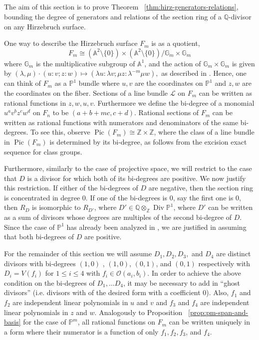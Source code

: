 \documentclass{amsart}
\theoremstyle{plain}
\theoremstyle{definition}
\theoremstyle{remark}
\numberwithin{equation}{subsection}
\newcommand\bq{{\mathbb Q}}
\newcommand\bp{{\mathbb P}}
\newcommand\bz{{\mathbb Z}}
\newcommand\ba{{\mathbb A}}
\newcommand\sco{{\mathscr O}}
\DeclareMathOperator\di{Div}
\newcommand\bida{a}
\newcommand\bidb{b}
\newcommand\hirz{F}
\DeclareMathOperator{\Pic}{Pic}
\begin{document}
\subsection{}
The aim of this section is to prove Theorem
~\ref{thm:hirz-generators-relations}, bounding the degree of
generators and relations of the section ring of a $\bq$-divisor
on any Hirzebruch surface.

One way to describe the Hirzebruch surface $\hirz_m$ is as a
quotient,
\[
\hirz_m \cong (\ba^2 \setminus \{0\}) \times (\ba^2 \setminus \{0\})/\mathbb G_m \times \mathbb G_m
\]
where $\mathbb G_m$ is the multiplicative subgroup of $\ba^1$, and the action of $\mathbb G_m \times \mathbb G_m$ is given by
$(\lambda, \mu) \cdot (u\colon v; z\colon w) \mapsto (\lambda u\colon \lambda v; \mu z\colon \lambda^{-m} \mu w),$ as described in \cite[p.~ 6]{zhao:counting-cubic}. Hence, one can think of
$\hirz_m$ as a $\bp^1$ bundle where $u,v$ are the coordinates on
$\bp^1$ and $z,w$ are the coordinates on the fiber.
Sections of a line bundle $\mathscr L$ on $\hirz_m$ can be written as
rational functions in $z, w, u, v$.
Furthermore we define the bi-degree of a monomial $u^a v^{b} z^c w^d$
on $\hirz_n$ to be
$(a + b + mc, c + d)$. Rational sections of $\hirz_m$ can be written as
rational functions with numerators and denominators of the same bi-degrees. To see this, 
observe
$\Pic(\hirz_m) \cong \bz \times \bz$, where the class of a line bundle
in $\Pic(\hirz_m)$
is determined by its bi-degree, as follows from the excision exact sequence
for class groups.

Furthermore, similarly to the case of projective space, 
we will restrict to the case that $D$ is a divisor
for which both of its bi-degrees are positive. We now justify this
restriction. If either of the bi-degrees of $D$ are negative,
then the section ring is concentrated in degree 0. If one of the
bi-degrees is 0, say the first one is 0, then $R_D$ is isomorphic
to $R_{D'}$, where $D' \in \bq \otimes_\bz \di \bp^1$, 
where $D'$ can be written as a sum of divisors whose degrees
are multiples of the second bi-degree of $D$. Since the case of
$\bp^1$ has already been analyzed in \cite{dorney:canonical}, we
are justified in assuming that both bi-degrees of $D$ are positive.


For the remainder of this section we will assume $D_1, D_2, D_3,$ and $D_4$ are
distinct divisors with bi-degrees $(1,0)$
, $(1,0)$, $(0,1)$, and $(0,1)$ respectively with $D_i = V(f_i)$ for $1 \leq i \leq 4$ with $f_i \in \sco(\bida_i, \bidb_i)$.  
In order to achieve the above condition on the bi-degrees of
$D_1, \ldots D_4$, it may be necessary to add in ``ghost divisors'' (i.e.
divisors with of the desired form with a coefficient $0$).
Also, $f_1$ and $f_2$ are independent linear
polynomials in $u$ and $v$ and $f_3$ and $f_4$ are independent
linear polynomials in $z$ and $w$.
Analogously to Proposition ~\ref{prop:pm-span-and-basis} for the case
of $\bp^m$, all rational functions on $\hirz_m$
can be written uniquely in a form where their numerator is a function
of only $f_1,f_2,f_3$, and $f_4$.
\end{document}

